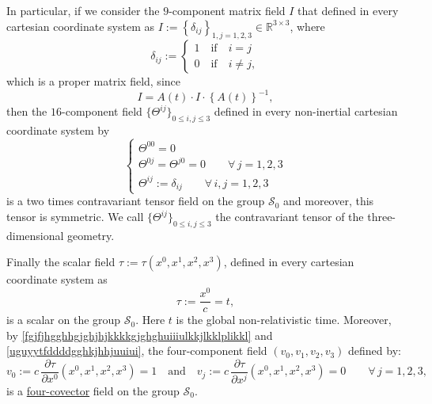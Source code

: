 \documentclass{article}
\theoremstyle{definition}
\theoremstyle{remark}
\newcommand{\R}{\mathbb{R}}
\newcommand{\er}{\eqref}
\newcommand{\R}{{\mathbb{R}}}
\newcommand{\er}{\eqref}
\begin{document}
In particular, if we consider the $9$-component matrix field $I$
that defined in every cartesian coordinate system as
$I:=\left\{\delta_{ij}\right\}_{1,j=1,2,3}\in \R^{3\times 3}$, where
\begin{equation}\label{huohuioy89gjjhjffffff3478zzrrZZZhjhhjhhjjhhffGGhjjhuiiuihhjkklpkl}
\delta_{ij}:=
\begin{cases}
1\quad\text{if}\quad i=j
\\
0\quad\text{if}\quad i\neq j,
\end{cases}
\end{equation}
which is a proper matrix field, since
\begin{equation}\label{uguyytfddddgghjjghjjjihohjjkkkook}
I=A(t)\cdot I\cdot \left\{A(t)\right\}^{-1},
\end{equation}
then the $16$-component field $\{{\Theta}^{ij}\}_{0\leq i,j\leq 3}$
defined in every non-inertial cartesian coordinate system by
\begin{equation}\label{huohuioy89gjjhjffffff3478zzrrZZZhjhhjhhjjhhffGGhjjhuiiuihhjkkoioi}
\begin{cases}
{\Theta}^{00}=0
\\
{\Theta}^{0j}={\Theta}^{j0}=0\quad\quad\forall\, j=1,2,3
\\
{\Theta}^{ij}:=\delta_{ij}\quad\quad\forall\, i,j=1,2,3
\end{cases}
\end{equation}
is a two times contravariant tensor field on the group
$\mathcal{S}_0$ and moreover, this tensor is symmetric. We call
$\{{\Theta}^{ij}\}_{0\leq i,j\leq 3}$ the contravariant tensor of
the three-dimensional geometry.

Finally the scalar field $\tau:=\tau(x^0,x^1,x^2,x^3)$, defined in
every cartesian coordinate system as
\begin{equation}\label{uguyytfddddgghkjhhjuuiui}
\tau:=\frac{x^0}{c}=t,
\end{equation}
is a scalar on the group $\mathcal{S}_0$. Here $t$ is the global
non-relativistic time. Moreover, by
\er{fgjfjhgghhgjghjhjkkkkgjghghuiiiulkkjlkklplikkl} and
\er{uguyytfddddgghkjhhjuuiui}, the four-component field
$(v_0,v_1,v_2,v_3)$ defined by:
\begin{equation}\label{fgjfjhgghhgjghjhjkkkkgjghghuiiiulkkjlkklplikklkjljghhgghk}
v_0:=c\,\frac{\partial \tau}{\partial
x^0}(x^0,x^1,x^2,x^3)=1\quad\text{and}\quad v_j:=c\,\frac{\partial
\tau}{\partial x^j}(x^0,x^1,x^2,x^3)=0\quad\quad\forall\,j=1,2,3,
\end{equation}
is a \underline{four-covector} field on the group $\mathcal{S}_0$.
\end{document}
